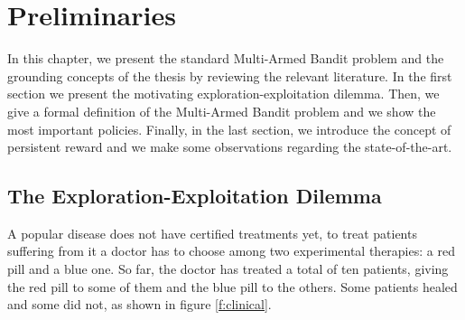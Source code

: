 \chapter{Preliminaries}\label{CPRELIMINARIES}

In this chapter, we present the standard Multi-Armed Bandit problem and the grounding concepts of the thesis by reviewing the relevant literature. In the first section we present the motivating exploration-exploitation dilemma. Then, we give a formal definition of the Multi-Armed Bandit problem and we show the most important policies. Finally, in the last section, we introduce the concept of persistent reward and we make some observations regarding the state-of-the-art.

\section{The Exploration-Exploitation Dilemma}

A popular disease does not have certified treatments yet, to treat patients suffering from it a doctor has to choose among two experimental therapies: a red pill and a blue one. So far, the doctor has treated a total of ten patients, giving the red pill to some of them and the blue pill to the others. Some patients healed and some did not, as shown in figure \ref{f:clinical}.


